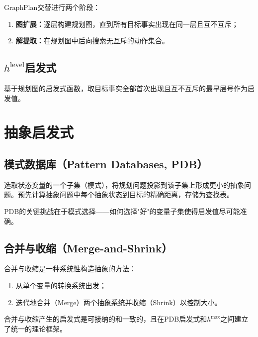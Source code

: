 GraphPlan交替进行两个阶段：
\begin{enumerate}
  \item \textbf{图扩展：}逐层构建规划图，直到所有目标事实出现在同一层且互不互斥；
  \item \textbf{解提取：}在规划图中后向搜索无互斥的动作集合。
\end{enumerate}

\subsection{$h^{\mathrm{level}}$启发式}

基于规划图的启发式函数，取目标事实全部首次出现且互不互斥的最早层号作为启发值。

\section{抽象启发式 \grad}

\subsection{模式数据库（Pattern Databases, PDB）}

\begin{definition}[模式数据库]
选取状态变量的一个子集（模式），将规划问题投影到该子集上形成更小的抽象问题。预先计算抽象问题中每个抽象状态到目标的精确距离，存储为查找表。
\end{definition}

PDB的关键挑战在于模式选择——如何选择"好"的变量子集使得启发值尽可能准确。

\subsection{合并与收缩（Merge-and-Shrink）}

合并与收缩是一种系统性构造抽象的方法：
\begin{enumerate}
  \item 从单个变量的转换系统出发；
  \item 迭代地合并（Merge）两个抽象系统并收缩（Shrink）以控制大小。
\end{enumerate}

\begin{keypoint}
合并与收缩产生的启发式是可接纳的和一致的，且在PDB启发式和$h^{\max}$之间建立了统一的理论框架。
\end{keypoint}


